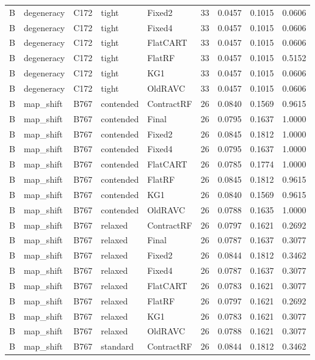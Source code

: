 \begin{longtable}{@{}lllllllll@{}}
B & degeneracy & C172 & tight & Fixed2 & 33 & 0.0457 & 0.1015 & 0.0606\\
B & degeneracy & C172 & tight & Fixed4 & 33 & 0.0457 & 0.1015 & 0.0606\\
B & degeneracy & C172 & tight & FlatCART & 33 & 0.0457 & 0.1015 & 0.0606\\
B & degeneracy & C172 & tight & FlatRF & 33 & 0.0457 & 0.1015 & 0.5152\\
B & degeneracy & C172 & tight & KG1 & 33 & 0.0457 & 0.1015 & 0.0606\\
B & degeneracy & C172 & tight & OldRAVC & 33 & 0.0457 & 0.1015 & 0.0606\\
B & map\_shift & B767 & contended & ContractRF & 26 & 0.0840 & 0.1569 & 0.9615\\
B & map\_shift & B767 & contended & Final & 26 & 0.0795 & 0.1637 & 1.0000\\
B & map\_shift & B767 & contended & Fixed2 & 26 & 0.0845 & 0.1812 & 1.0000\\
B & map\_shift & B767 & contended & Fixed4 & 26 & 0.0795 & 0.1637 & 1.0000\\
B & map\_shift & B767 & contended & FlatCART & 26 & 0.0785 & 0.1774 & 1.0000\\
B & map\_shift & B767 & contended & FlatRF & 26 & 0.0845 & 0.1812 & 0.9615\\
B & map\_shift & B767 & contended & KG1 & 26 & 0.0840 & 0.1569 & 0.9615\\
B & map\_shift & B767 & contended & OldRAVC & 26 & 0.0788 & 0.1635 & 1.0000\\
B & map\_shift & B767 & relaxed & ContractRF & 26 & 0.0797 & 0.1621 & 0.2692\\
B & map\_shift & B767 & relaxed & Final & 26 & 0.0787 & 0.1637 & 0.3077\\
B & map\_shift & B767 & relaxed & Fixed2 & 26 & 0.0844 & 0.1812 & 0.3462\\
B & map\_shift & B767 & relaxed & Fixed4 & 26 & 0.0787 & 0.1637 & 0.3077\\
B & map\_shift & B767 & relaxed & FlatCART & 26 & 0.0783 & 0.1621 & 0.3077\\
B & map\_shift & B767 & relaxed & FlatRF & 26 & 0.0797 & 0.1621 & 0.2692\\
B & map\_shift & B767 & relaxed & KG1 & 26 & 0.0783 & 0.1621 & 0.3077\\
B & map\_shift & B767 & relaxed & OldRAVC & 26 & 0.0788 & 0.1621 & 0.3077\\
B & map\_shift & B767 & standard & ContractRF & 26 & 0.0844 & 0.1812 & 0.3462\\

\end{longtable}
